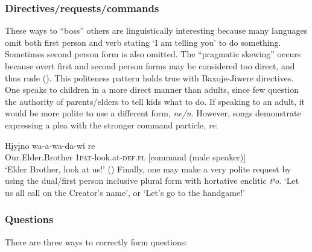 \documentclass[output=paper]{LSP/langsci}
\begin{document}
\subsubsection{Directives/requests/commands}  These ways to ``boss'' others are linguistically interesting because many languages omit both first person and verb stating `I am telling you' to do something.  Sometimes second person form is also omitted. The ``pragmatic skewing'' occurs because overt first and second person forms may be considered too direct, and thus rude (\citealt{Heath1998}). This politeness pattern holds true with Baxoje-Jiwere directives. One speaks to children in a more direct manner than adults, since few question the authority of parents/elders to tell kids what to do.  If speaking to an adult, it would be more polite to use a different form, \textit{ne/n}.  However, songs demonstrate expressing a plea with the stronger command particle, \textit{re}: 	     											

\ea \gll H\k{i}y\k{i}no    		 wa-a-wa-da-wi          re 	\\                                  	 
Our.Elder.Brother 1\textsc{pat}-look.at-\textsc{def.pl}  [command (male speaker)]	 \\	   	    
\trans `Elder Brother, look at us!'  (\citealt{Davidson1997})  	
\z				             
Finally, one may make a very polite request by using the dual/first person inclusive plural form with hortative enclitic \textit{tʰo}. `Let us all call on the Creator's name', or `Let's go to the handgame!'  		

\subsubsection{Questions} There are three ways to correctly form questions:  	
	          			
\end{document}
